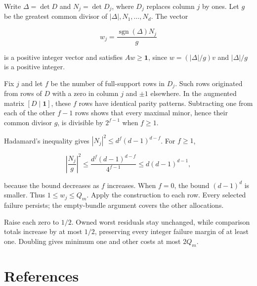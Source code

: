 \documentclass[
  11pt,
]{article}
\begin{document}
Write \(\Delta=\det D\) and \(N_j=\det D_j\), where \(D_j\) replaces
column \(j\) by ones. Let \(g\) be the greatest common divisor of
\(|\Delta|,N_1,\ldots,N_d\). The vector

\[
w_j=\frac{\operatorname{sgn}(\Delta)N_j}{g}
\]

is a positive integer vector and satisfies \(Aw\ge\mathbf1\), since
\(w=(|\Delta|/g)v\) and \(|\Delta|/g\) is a positive integer.

Fix \(j\) and let \(f\) be the number of full-support rows in \(D_j\).
Such rows originated from rows of \(D\) with a zero in column \(j\) and
\(\pm1\) elsewhere. In the augmented matrix \([D\mid\mathbf1]\), these
\(f\) rows have identical parity patterns. Subtracting one from each of
the other \(f-1\) rows shows that every maximal minor, hence their
common divisor \(g\), is divisible by \(2^{f-1}\) when \(f\ge1\).

Hadamard's inequality gives \(|N_j|^2\le d^f(d-1)^{d-f}\). For
\(f\ge1\),

\[
\left|\frac{N_j}{g}\right|^2
\le\frac{d^f(d-1)^{d-f}}{4^{f-1}}
\le d(d-1)^{d-1},
\]

because the bound decreases as \(f\) increases. When \(f=0\), the bound
\((d-1)^d\) is smaller. Thus \(1\le w_j\le Q_m\). Apply the construction
to each row. Every selected failure persists; the empty-bundle argument
covers the other allocations.

Raise each zero to \(1/2\). Owned worst residuals stay unchanged, while
comparison totals increase by at most \(1/2\), preserving every integer
failure margin of at least one. Doubling gives minimum one and other
costs at most \(2Q_m\).

\section{References}\label{references}
\end{document}
